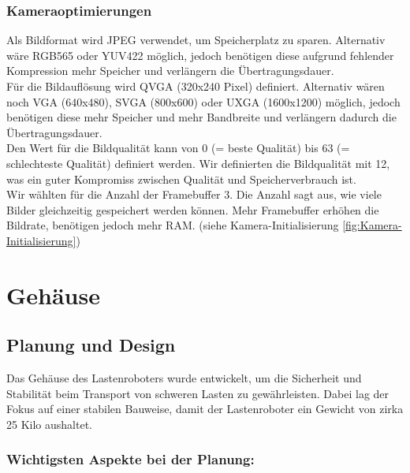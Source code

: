 \documentclass[ngerman,12pt,a4paper]{article}
\begin{document}
							\subsubsection*{Kameraoptimierungen}
	Als Bildformat wird JPEG verwendet, um Speicherplatz zu sparen. Alternativ wäre RGB565 oder YUV422 möglich, jedoch benötigen diese aufgrund fehlender Kompression mehr Speicher und verlängern die Übertragungsdauer. \\[0.5cm]
	Für die Bildauflösung wird QVGA (320x240 Pixel) definiert. Alternativ wären noch VGA (640x480), SVGA (800x600) oder UXGA (1600x1200) möglich, jedoch benötigen diese mehr Speicher und mehr Bandbreite und verlängern dadurch die Übertragungsdauer.\\[0.5cm]
	Den Wert für die Bildqualität kann von 0 (= beste Qualität) bis 63 (= schlechteste Qualität) definiert werden. Wir definierten die Bildqualität mit 12, was ein guter Kompromiss zwischen Qualität und Speicherverbrauch ist.\\[0.5cm]
	Wir wählten für die Anzahl der Framebuffer 3. Die Anzahl sagt aus, wie viele Bilder gleichzeitig gespeichert werden können. Mehr Framebuffer erhöhen die Bildrate, benötigen jedoch mehr RAM. (siehe Kamera-Initialisierung \ref{fig:Kamera-Initialisierung})\\[0.5cm]
					
	\newpage
	\section{Gehäuse}
		\subsection{Planung und Design} %
		
		Das Gehäuse des Lastenroboters wurde entwickelt, um die Sicherheit und Stabilität beim Transport von schweren Lasten zu gewährleisten. Dabei lag der Fokus auf einer stabilen Bauweise, damit der Lastenroboter ein Gewicht von zirka 25 Kilo aushaltet. 
		
			\subsubsection*{Wichtigsten Aspekte bei der Planung: }
		
\end{document}
